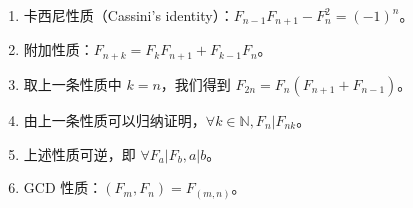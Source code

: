 \begin{enumerate}
    \item 卡西尼性质（Cassini's identity）：\( F_{n-1} F_{n+1} - F_n^2 = (-1)^n \)。
    \item 附加性质：\( F_{n+k} = F_k F_{n+1} + F_{k-1} F_n \)。
    \item 取上一条性质中 \( k = n \)，我们得到 \( F_{2n} = F_n (F_{n+1} + F_{n-1}) \)。
    \item 由上一条性质可以归纳证明，\( \forall k\in \mathbb{N},F_n|F_{nk} \)。
    \item 上述性质可逆，即 \( \forall F_a|F_b,a|b \)。
    \item GCD 性质：\( (F_m, F_n) = F_{(m, n)} \)。
\end{enumerate}
